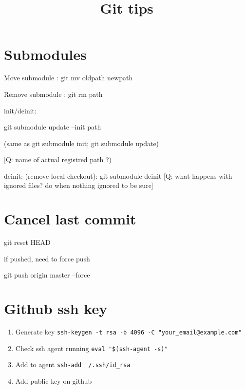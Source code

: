 


\title{Git tips}



\date{}


\maketitle

\justify

\renewcommand{\abstractname}{}

\begin{abstract}

\end{abstract}


\section*{Submodules}

Move submodule : git mv oldpath newpath

Remove submodule : git rm path

init/deinit: 

git submodule update --init path

(same as git submodule init; git submodule update)

[Q: name of actual registred path ?)

deinit: (remove local checkout): git submodule deinit
[Q: what happens with ignored files? do when nothing ignored to be sure]

\section*{Cancel last commit}

git reset HEAD~

if pushed, need to force push 

git push origin master --force



\section*{Github ssh key}


\begin{enumerate}
\item Generate key \texttt{ssh-keygen -t rsa -b 4096 -C "your{\_}email@example.com"}
\item Check ssh agent running \texttt{eval "{\$}(ssh-agent -s)"}
\item Add to agent \texttt{ssh-add ~/.ssh/id{\_}rsa}
\item Add public key on github
\end{enumerate}




